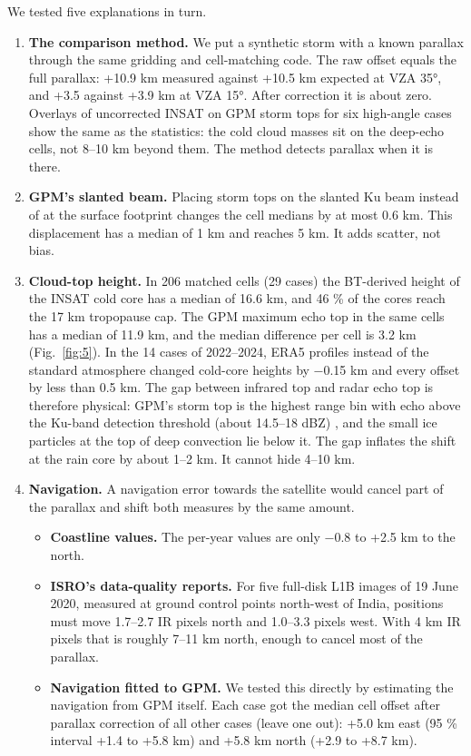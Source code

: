 We tested five explanations in turn.

\begin{enumerate}
\def\labelenumi{\arabic{enumi}.}
\item
  \textbf{The comparison method.} We put a synthetic storm with a known parallax through the same gridding and cell-matching code. The raw offset equals the full parallax: +10.9 km measured against +10.5 km expected at VZA 35°, and +3.5 against +3.9 km at VZA 15°. After correction it is about zero. Overlays of uncorrected INSAT on GPM storm tops for six high-angle cases show the same as the statistics: the cold cloud masses sit on the deep-echo cells, not 8--10 km beyond them. The method detects parallax when it is there.
\item
  \textbf{GPM's slanted beam.} Placing storm tops on the slanted Ku beam instead of at the surface footprint changes the cell medians by at most 0.6 km. This displacement has a median of 1 km and reaches 5 km. It adds scatter, not bias.
\item
  \textbf{Cloud-top height.} In 206 matched cells (29 cases) the BT-derived height of the INSAT cold core has a median of 16.6 km, and 46 \% of the cores reach the 17 km tropopause cap. The GPM maximum echo top in the same cells has a median of 11.9 km, and the median difference per cell is 3.2 km (Fig.~\ref{fig:5}). In the 14 cases of 2022--2024, ERA5 profiles instead of the standard atmosphere changed cold-core heights by −0.15 km and every offset by less than 0.5 km. The gap between infrared top and radar echo top is therefore physical: GPM's storm top is the highest range bin with echo above the Ku-band detection threshold (about 14.5--18 dBZ) \citep{hou2014,toyoshima2015}, and the small ice particles at the top of deep convection lie below it. The gap inflates the shift at the rain core by about 1--2 km. It cannot hide 4--10 km.
\item
  \textbf{Navigation.} A navigation error towards the satellite would cancel part of the parallax and shift both measures by the same amount.

  \begin{itemize}
  \tightlist
  \item
    \textbf{Coastline values.} The per-year values are only −0.8 to +2.5 km to the north.
  \item
    \textbf{ISRO's data-quality reports.} For five full-disk L1B images of 19 June 2020, measured at ground control points north-west of India, positions must move 1.7--2.7 IR pixels north and 1.0--3.3 pixels west. With 4 km IR pixels that is roughly 7--11 km north, enough to cancel most of the parallax.
  \item
    \textbf{Navigation fitted to GPM.} We tested this directly by estimating the navigation from GPM itself. Each case got the median cell offset after parallax correction of all other cases (leave one out): +5.0 km east (95 \% interval +1.4 to +5.8 km) and +5.8 km north (+2.9 to +8.7 km).
  \end{itemize}


\end{enumerate}
